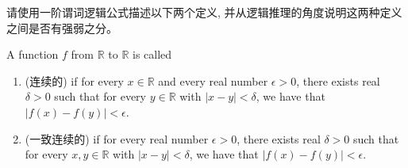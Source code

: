 \documentclass[a4paper, justified]{tufte-handout}
\begin{document}
\begin{problem}
  请使用一阶谓词逻辑公式描述以下两个定义,
  并从逻辑推理的角度说明这两种定义之间是否有强弱之分。

  A function $f$ from $\mathbb{R}$ to $\mathbb{R}$ is called
  \begin{enumerate}[(1)]
    \setlength{\itemsep}{10pt}
    \item {} (连续的) if
      for every $x \in \mathbb{R}$
      and every real number $\epsilon > 0$,
      there exists real $\delta > 0$ such that
      for every $y \in \mathbb{R}$ with $|x - y| < \delta$,
      we have that $|f(x) -  f(y)|< \epsilon$.
    \item {} (一致连续的) if
      for every real number $\epsilon > 0$,
      there exists real $\delta > 0$ such that
      for every $x, y \in \mathbb{R}$ with $|x - y| < \delta$,
      we have that $|f(x) -  f(y)|< \epsilon$.
  \end{enumerate}
\end{problem}
\end{document}
